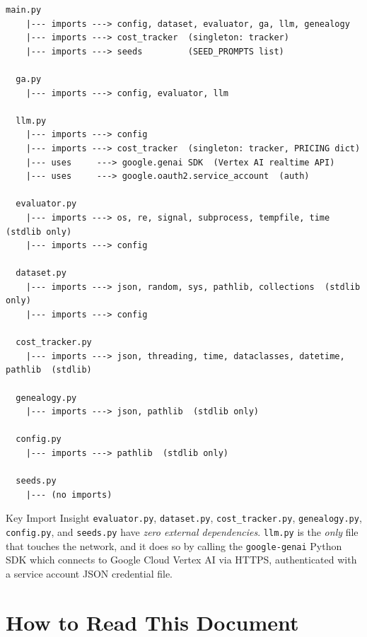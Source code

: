 \documentclass[11pt,a4paper]{report}
\newcommand{\pyfile}[1]{\texttt{#1}}
\begin{document}
\begin{lstlisting}[style=chain, caption={Module import graph (arrows = imports).}]
  main.py
    |--- imports ---> config, dataset, evaluator, ga, llm, genealogy
    |--- imports ---> cost_tracker  (singleton: tracker)
    |--- imports ---> seeds         (SEED_PROMPTS list)

  ga.py
    |--- imports ---> config, evaluator, llm

  llm.py
    |--- imports ---> config
    |--- imports ---> cost_tracker  (singleton: tracker, PRICING dict)
    |--- uses     ---> google.genai SDK  (Vertex AI realtime API)
    |--- uses     ---> google.oauth2.service_account  (auth)

  evaluator.py
    |--- imports ---> os, re, signal, subprocess, tempfile, time  (stdlib only)
    |--- imports ---> config

  dataset.py
    |--- imports ---> json, random, sys, pathlib, collections  (stdlib only)
    |--- imports ---> config

  cost_tracker.py
    |--- imports ---> json, threading, time, dataclasses, datetime, pathlib  (stdlib)

  genealogy.py
    |--- imports ---> json, pathlib  (stdlib only)

  config.py
    |--- imports ---> pathlib  (stdlib only)

  seeds.py
    |--- (no imports)
\end{lstlisting}

\begin{conceptbox}{Key Import Insight}
\pyfile{evaluator.py}, \pyfile{dataset.py}, \pyfile{cost\_tracker.py}, \pyfile{genealogy.py},
\pyfile{config.py}, and \pyfile{seeds.py} have \emph{zero external dependencies}.
\pyfile{llm.py} is the \emph{only} file that touches the network, and it does so by calling
the \texttt{google-genai} Python SDK which connects to Google Cloud Vertex AI via HTTPS,
authenticated with a service account JSON credential file.
\end{conceptbox}

\section{How to Read This Document}
\end{document}
